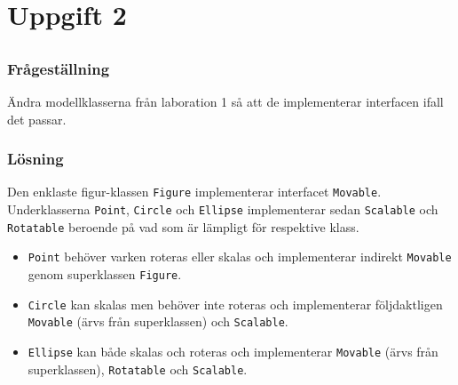 %
%

\section{Uppgift 2}\label{sec:uppg2}

\subsection{}\label{sec:uppg2a}
\subsubsection*{Frågeställning}
Ändra modellklasserna från laboration 1 så att de implementerar interfacen
ifall det passar.

\subsubsection*{Lösning}
Den enklaste figur-klassen \texttt{Figure} implementerar interfacet
\texttt{Movable}.  Underklasserna \texttt{Point}, \texttt{Circle} och
\texttt{Ellipse} implementerar sedan \texttt{Scalable} och \texttt{Rotatable}
beroende på vad som är lämpligt för respektive klass.

\begin{itemize}
\item \texttt{Point} behöver varken roteras eller skalas och implementerar
      indirekt \texttt{Movable} genom superklassen \texttt{Figure}.
\item \texttt{Circle} kan skalas men behöver inte roteras och implementerar
      följdaktligen \texttt{Movable} (ärvs från superklassen) och 
      \texttt{Scalable}.
\item \texttt{Ellipse} kan både skalas och roteras och implementerar
      \texttt{Movable} (ärvs från superklassen), \texttt{Rotatable} och 
      \texttt{Scalable}.
\end{itemize}

